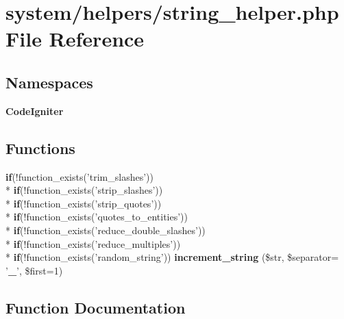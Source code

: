 \section{system/helpers/string\-\_\-helper.php File Reference}
\label{string__helper_8php}
\subsection*{Namespaces}
\begin{DoxyCompactItemize}
\item 
{\bf Code\-Igniter}
\end{DoxyCompactItemize}
\subsection*{Functions}
\begin{DoxyCompactItemize}
\item 
{\bf if}(!function\-\_\-exists('trim\-\_\-slashes')) \\*
{\bf if}(!function\-\_\-exists('strip\-\_\-slashes')) \\*
{\bf if}(!function\-\_\-exists('strip\-\_\-quotes')) \\*
{\bf if}(!function\-\_\-exists('quotes\-\_\-to\-\_\-entities')) \\*
{\bf if}(!function\-\_\-exists('reduce\-\_\-double\-\_\-slashes')) \\*
{\bf if}(!function\-\_\-exists('reduce\-\_\-multiples')) \\*
{\bf if}(!function\-\_\-exists('random\-\_\-string')) {\bf increment\-\_\-string} (\$str, \$separator= '{\bf \-\_\-}', \$first=1)
\end{DoxyCompactItemize}


\subsection{Function Documentation}
